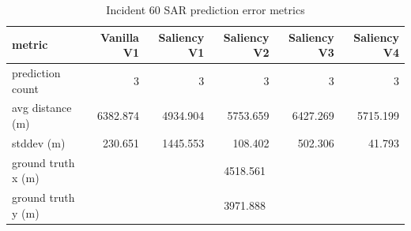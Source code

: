 \begin{table}[ht]
\centering
\caption{Incident 60 SAR prediction error metrics}
\label{tab:sar-incident-60}
\begin{tabular}{lrrrrr}
\hline
metric & Vanilla V1 & Saliency V1 & Saliency V2 & Saliency V3 & Saliency V4 \\
\hline
prediction count & 3 & 3 & 3 & 3 & 3 \\
avg distance (m) & 6382.874 & 4934.904 & 5753.659 & 6427.269 & 5715.199 \\
stddev (m) & 230.651 & 1445.553 & 108.402 & 502.306 & 41.793 \\
ground truth x (m) & \multicolumn{5}{c}{4518.561} \\
ground truth y (m) & \multicolumn{5}{c}{3971.888} \\
\hline
\end{tabular}
\end{table}
